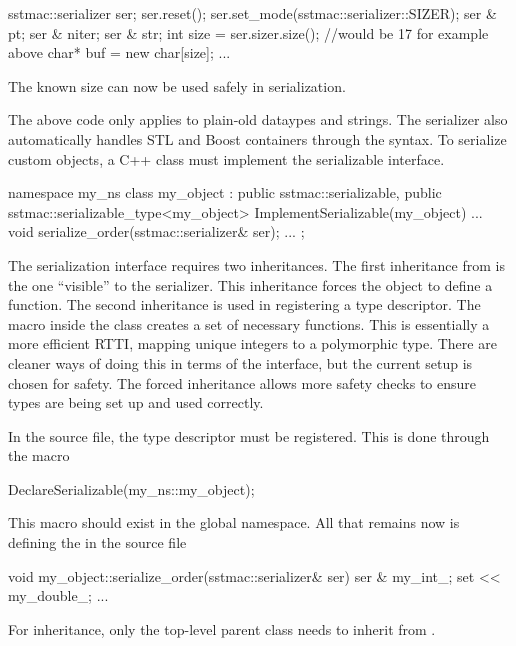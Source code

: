 \begin{CppCode}
sstmac::serializer ser;
ser.reset();
ser.set_mode(sstmac::serializer::SIZER);
ser & pt;
ser & niter;
ser & str;
int size = ser.sizer.size(); //would be 17 for example above
char* buf = new char[size];
...
\end{CppCode}
The known size can now be used safely in serialization.

The above code only applies to plain-old dataypes and strings.
The serializer also automatically handles STL and Boost containers
through the \inlinecode{<<} syntax.
To serialize custom objects, a C++ class must implement the serializable interface.

\begin{CppCode}
namespace my_ns {
class my_object : 
  public sstmac::serializable,
  public sstmac::serializable_type<my_object>
{
 ImplementSerializable(my_object)
 ...
 void
 serialize_order(sstmac::serializer& ser);
 ...
};
}
\end{CppCode}
The serialization interface requires two inheritances.
The first inheritance from  is the one ``visible'' to the serializer.
This inheritance forces the object to define a  function.
The second inheritance is used in registering a type descriptor.
The macro  inside the class creates a set of necessary functions.
This is essentially a more efficient RTTI, mapping unique integers to a polymorphic type.
There are cleaner ways of doing this in terms of the interface,
but the current setup is chosen for safety.
The forced inheritance allows more safety checks to ensure types are being set up and used correctly.

In the source file, the type descriptor must be registered.
This is done through the macro

\begin{CppCode}
DeclareSerializable(my_ns::my_object);
\end{CppCode}
This macro should exist in the global namespace.
All that remains now is defining the  in the source file

\begin{CppCode}
void my_object::serialize_order(sstmac::serializer& ser)
{
  ser & my_int_;
  set << my_double_;
  ...
}
\end{CppCode}

For inheritance, only the top-level parent class needs to inherit from .

